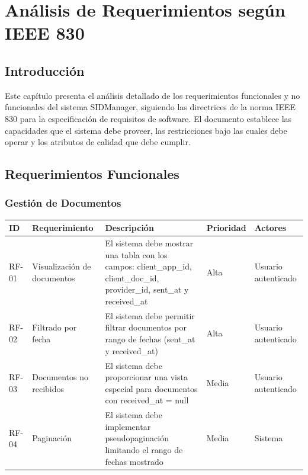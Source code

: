 

\chapter{Análisis de Requerimientos según IEEE 830}

\section{Introducción}
Este capítulo presenta el análisis detallado de los requerimientos funcionales y no funcionales del sistema SIDManager, siguiendo las directrices de la norma IEEE 830 para la especificación de requisitos de software. El documento establece las capacidades que el sistema debe proveer, las restricciones bajo las cuales debe operar y los atributos de calidad que debe cumplir.

\section{Requerimientos Funcionales}

\subsection{Gestión de Documentos}

\begin{longtable}{|>{\raggedright\arraybackslash}p{1.25cm}|>{\raggedright\arraybackslash}p{3.5cm}|>{\raggedright\arraybackslash}p{5.5cm}|>{\raggedright\arraybackslash}p{1.75cm}|>{\raggedright\arraybackslash}p{2.5cm}|}
\hline
\textbf{ID} & \textbf{Requerimiento} & \textbf{Descripción} & \textbf{Prioridad} & \textbf{Actores} \\
\hline
RF-01 & Visualización de documentos & El sistema debe mostrar una tabla con los campos: client\_app\_id, client\_doc\_id, provider\_id, sent\_at y received\_at & Alta & Usuario autenticado \\
\hline
RF-02 & Filtrado por fecha & El sistema debe permitir filtrar documentos por rango de fechas (sent\_at y received\_at) & Alta & Usuario autenticado \\
\hline
RF-03 & Documentos no recibidos & El sistema debe proporcionar una vista especial para documentos con received\_at = null & Media & Usuario autenticado \\
\hline
RF-04 & Paginación & El sistema debe implementar pseudopaginación limitando el rango de fechas mostrado & Media & Sistema \\
\hline
\end{longtable}


